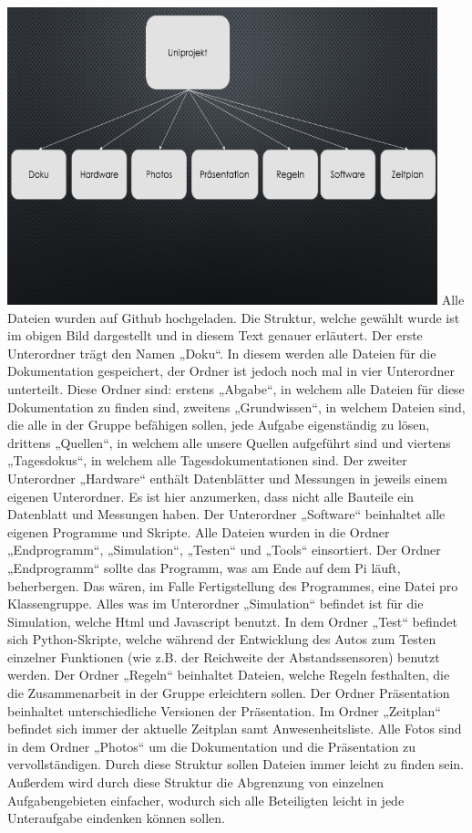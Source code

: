 \documentclass{report}
\begin{document}
\includegraphics{Struktur.png}
Alle Dateien wurden auf Github hochgeladen. Die Struktur, welche gewählt wurde ist im obigen Bild dargestellt und in diesem Text genauer erläutert. 
Der erste Unterordner trägt den Namen „Doku“. In diesem werden alle Dateien für die Dokumentation gespeichert, der Ordner ist jedoch noch mal in vier Unterordner unterteilt. Diese Ordner sind: erstens „Abgabe“, in welchem alle Dateien für diese Dokumentation zu finden sind, zweitens „Grundwissen“, in welchem Dateien sind, die alle in der Gruppe befähigen sollen, jede Aufgabe eigenständig zu lösen, drittens „Quellen“, in welchem alle unsere Quellen aufgeführt sind und viertens „Tagesdokus“, in welchem alle Tagesdokumentationen sind.
Der zweiter Unterordner „Hardware“ enthält Datenblätter und Messungen in jeweils einem eigenen Unterordner. Es ist hier anzumerken, dass nicht alle Bauteile ein Datenblatt und Messungen haben.
Der Unterordner „Software“ beinhaltet alle eigenen Programme und Skripte. Alle Dateien wurden in die Ordner „Endprogramm“, „Simulation“, „Testen“ und „Tools“ einsortiert. Der Ordner „Endprogramm“ sollte das Programm, was am Ende auf dem Pi läuft, beherbergen. Das wären, im Falle Fertigstellung des Programmes, eine Datei pro Klassengruppe.  Alles was im Unterordner „Simulation“ befindet ist für die Simulation, welche Html und Javascript benutzt. In dem Ordner „Test“ befindet sich Python-Skripte, welche während der Entwicklung des Autos zum Testen einzelner Funktionen (wie z.B. der Reichweite der Abstandssensoren) benutzt werden.
Der Ordner „Regeln“ beinhaltet Dateien, welche Regeln festhalten, die die Zusammenarbeit in der Gruppe erleichtern sollen. Der Ordner Präsentation beinhaltet unterschiedliche Versionen der Präsentation. Im Ordner „Zeitplan“ befindet sich immer der aktuelle Zeitplan samt Anwesenheitsliste.  Alle Fotos sind in dem Ordner „Photos“ um die Dokumentation und die Präsentation zu vervollständigen. 
Durch diese Struktur sollen Dateien immer leicht zu finden sein. Außerdem wird durch diese Struktur die Abgrenzung von einzelnen Aufgabengebieten einfacher, wodurch sich alle Beteiligten leicht in jede Unteraufgabe eindenken können sollen. 
\end{document}
